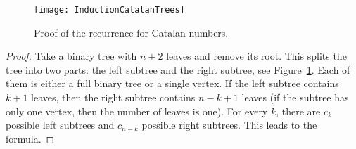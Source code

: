 
\begin{figure}[ht]
\begin{center}
\texttt{[image: InductionCatalanTrees]}
\end{center}
\caption{Proof of the recurrence for Catalan numbers.}
\label{fig:InductionCatalanTrees}
\end{figure}

\begin{proof}
Take a binary tree with $n+2$ leaves and remove its root.
This splits the tree into two parts: the left subtree and the right subtree, see Figure~\ref{fig:InductionCatalanTrees}.
Each of them is either a full binary tree or a single vertex.
If the left subtree contains $k+1$ leaves, then the right subtree contains $n-k+1$ leaves
(if the subtree has only one vertex, then the number of leaves is one).
For every $k$, there are $c_k$ possible left subtrees and $c_{n-k}$ possible right subtrees.
This leads to the formula.
\end{proof}

